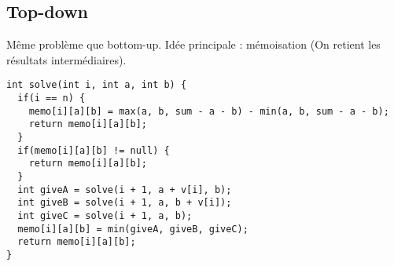 \subsection{Top-down}
Même problème que bottom-up. Idée principale : mémoisation (On retient les résultats intermédiaires).
\newline
\begin{lstlisting}
int solve(int i, int a, int b) {
  if(i == n) {
    memo[i][a][b] = max(a, b, sum - a - b) - min(a, b, sum - a - b);
    return memo[i][a][b]; 
  }
  if(memo[i][a][b] != null) {
    return memo[i][a][b];
  }
  int giveA = solve(i + 1, a + v[i], b);
  int giveB = solve(i + 1, a, b + v[i]);
  int giveC = solve(i + 1, a, b);
  memo[i][a][b] = min(giveA, giveB, giveC);
  return memo[i][a][b];
}
\end{lstlisting}